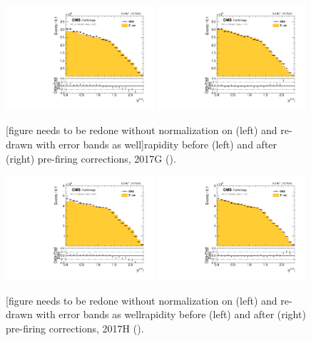 \begin{figure}[htb]
\centering
\includegraphics[width=0.49\textwidth]{plots/Prefire/Zee5_Zrap_noPrefire.pdf}
\includegraphics[width=0.49\textwidth]{plots/Prefire/Zee5_Zrap_inclPrefire.pdf}
\caption{[figure needs to be redone without normalization on (left) and re-drawn with error bands as well]\zee rapidity before (left) and after (right) pre-firing corrections, 2017G (\sg).}
\label{fig:prefire:zrap:2017G}
\end{figure}

\begin{figure}[htb]
\includegraphics[width=0.49\textwidth]{plots/Prefire/Zee13_Zrap_noPrefire.pdf}
\includegraphics[width=0.49\textwidth]{plots/Prefire/Zee13_Zrap_inclPrefire.pdf}
\caption{[figure needs to be redone without normalization on (left) and re-drawn with error bands as well\zee rapidity before (left) and after (right) pre-firing corrections, 2017H (\sh).}
\label{fig:prefire:zrap:2017H}
\end{figure}